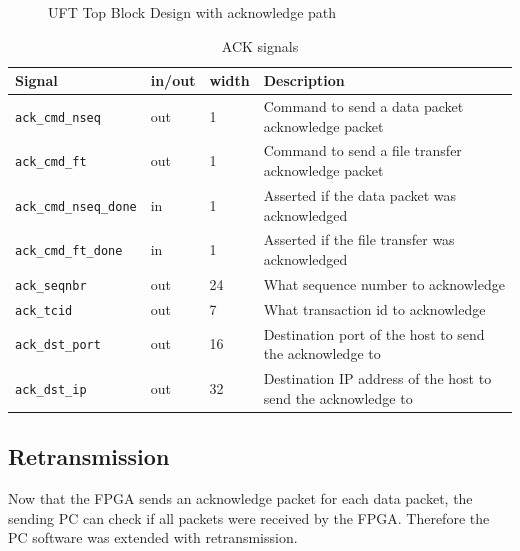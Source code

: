 \begin{figure}[b!]
    \centering
    \begin{adjustbox}{max width=\textwidth}
        
    \end{adjustbox}
    \caption{UFT Top Block Design with acknowledge path}
    \label{fig:ufttop}
\end{figure}


\begin{table}[tb!]
    \centering
    \begin{tabular}{l l l p{8.5cm}}
        \toprule
        Signal & in/out & width & Description \\
        \midrule
        \texttt{ack\_cmd\_nseq} & out & 1 &
        Command to send a data packet acknowledge packet
        \\
        \texttt{ack\_cmd\_ft} & out &1 &
        Command to send a file transfer acknowledge packet
        \\
        \texttt{ack\_cmd\_nseq\_done} & in &1 &
        Asserted if the data packet was acknowledged
        \\
        \texttt{ack\_cmd\_ft\_done} & in &1 &
        Asserted if the file transfer was acknowledged
        \\
        \texttt{ack\_seqnbr} & out & 24 &
        What sequence number to acknowledge
        \\
        \texttt{ack\_tcid} & out & 7 &
        What transaction id to acknowledge
        \\
        \texttt{ack\_dst\_port} & out & 16 &
        Destination port of the host to send the acknowledge to
        \\
        \texttt{ack\_dst\_ip} & out & 32 &
        Destination IP address of the host to send the acknowledge to
        \\
        \bottomrule
    \end{tabular}
    \caption{ACK signals}
    \label{tab:acksignals}
\end{table}

\subsection{Retransmission}
Now that the FPGA sends an acknowledge packet for each data packet, the sending
PC can check if all packets were received by the FPGA. Therefore the PC software
was extended with retransmission. 

